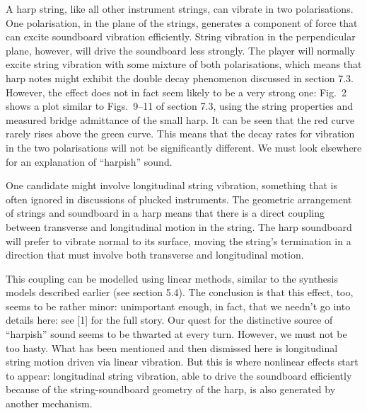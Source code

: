   A harp string, like all other instrument strings, can vibrate in two 
  polarisations. One polarisation, in the plane of the strings, generates a 
  component of force that can excite soundboard vibration efficiently. String 
  vibration in the perpendicular plane, however, will drive the soundboard less 
  strongly. The player will normally excite string vibration with some mixture 
  of both polarisations, which means that harp notes might exhibit the double 
  decay phenomenon discussed in section 7.3. However, the effect does not in 
  fact seem likely to be a very strong one: Fig.\ 2 shows a plot similar to 
  Figs.\ 9--11 of section 7.3, using the string properties and measured bridge 
  admittance of the small harp. It can be seen that the red curve rarely rises 
  above the green curve. This means that the decay rates for vibration in the 
  two polarisations will not be significantly different. We must look elsewhere 
  for an explanation of ``harpish'' sound. 


  One candidate might involve longitudinal string vibration, something that is 
  often ignored in discussions of plucked instruments. The geometric 
  arrangement of strings and soundboard in a harp means that there is a direct 
  coupling between transverse and longitudinal motion in the string. The harp 
  soundboard will prefer to vibrate normal to its surface, moving the string's 
  termination in a direction that must involve both transverse and longitudinal 
  motion. 

  This coupling can be modelled using linear methods, similar to the synthesis 
  models described earlier (see section 5.4). The conclusion is that this 
  effect, too, seems to be rather minor: unimportant enough, in fact, that we 
  needn't go into details here: see [1] for the full story. Our quest for the 
  distinctive source of ``harpish'' sound seems to be thwarted at every turn. 
  However, we must not be too hasty. What has been mentioned and then dismissed 
  here is longitudinal string motion driven via linear vibration. But this is 
  where nonlinear effects start to appear: longitudinal string vibration, able 
  to drive the soundboard efficiently because of the string-soundboard geometry 
  of the harp, is also generated by another mechanism. 


